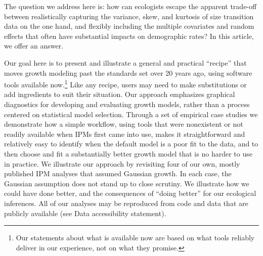 \documentclass[12pt]{article}
\begin{document}
The question we address here is: how can ecologists escape the apparent trade-off between realistically capturing the variance, skew, and kurtosis of size transition data on the one hand, and flexibly including the multiple covariates and random effects that often have substantial impacts on demographic rates?   
In this article, we offer an answer. 

Our goal here is to present and illustrate a general and practical ``recipe'' that moves growth modeling past the standards set over 20 years ago, using software tools available now.\footnote{Our statements about what is available now are based on what tools reliably deliver in our experience, not on what they promise.} 
Like any recipe, users may need to make substitutions or add ingredients to suit their situation. 
Our approach emphasizes graphical diagnostics for developing and evaluating growth models, rather than a process centered on statistical model selection. 
Through a set of empirical case studies we demonstrate how a simple workflow, using tools that were nonexistent or not readily available when IPMs first came into use, makes it straightforward and relatively easy to identify when the default model is a poor fit to the data, and to then choose and fit a substantially better growth model that is no harder to use in practice. 
We illustrate our approach by revisiting four of our own, mostly published IPM analyses that assumed Gaussian growth.
In each case, the Gaussian assumption does not stand up to close scrutiny. 
We illustrate how we could have done better, and the consequences of ``doing better'' for our ecological inferences. 
All of our analyses may be reproduced from code and data that are publicly available (see Data accessibility statement). 
\end{document}
